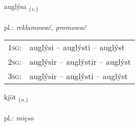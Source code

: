 \documentclass[frontgrid, backgrid]{flacards}\usepackage[]{graphicx}\usepackage[]{xcolor}
\begin{document}
\renewcommand{\flhead}{\vskip5pt \fboxsep=0pt {\small\bfseries\footnotesize Sagnorð | Verb}}
\renewcommand{\fcfoot}{\vskip5pt \fboxsep=0pt \hspace{2pt}{\small\bfseries\footnotesize 2K}}

\renewcommand{\blhead}{\vskip5pt {\small\bfseries\footnotesize Sagnorð | Verb }}
\renewcommand{\bcfoot}{\vskip5pt \hspace{2pt}{\small\bfseries\footnotesize 2K}}


{auglýsa \small{\textsubscript{(\textit{v.})}} \\[1ex] %
\textphonetic{[œiɣlisa]} \\
pl.: \emph{reklamować, promować} \\  [2ex]
\renewcommand*{\arraystretch}{0.8}
\begin{tabular}{p{1cm}l}
\textsc{1sg}: & auglýsi -- auglýsti -- auglýst \\ 
\textsc{2sg}: & auglýsir -- auglýstir -- auglýst \\ 
\textsc{3sg}: & auglýsir -- auglýsti -- auglýst \\ 
\end{tabular}
}

\renewcommand{\flhead}{\vskip5pt \fboxsep=0pt {\small\bfseries\footnotesize Nafnorð | Noun}}
\renewcommand{\fcfoot}{\vskip5pt \fboxsep=0pt \hspace{2pt}{\small\bfseries\footnotesize 2K}}

\renewcommand{\blhead}{\vskip5pt {\small\bfseries\footnotesize Nafnorð | Noun }}
\renewcommand{\bcfoot}{\vskip5pt \hspace{2pt}{\small\bfseries\footnotesize 2K}}


{kjöt \small{\textsubscript{(\textit{n.})}} \\[1ex] %
\textphonetic{[cʰœːt]} \\
pl.: \emph{mięso} \\  [2ex]
\renewcommand*{\arraystretch}{0.8}
}
\end{document}
